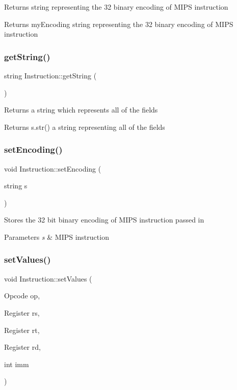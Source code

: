 Returns string representing the 32 binary encoding of M\+I\+PS instruction \begin{DoxyReturn}{Returns}
my\+Encoding string representing the 32 binary encoding of M\+I\+PS instruction 
\end{DoxyReturn}
\mbox{\label{class_instruction_a3deaa9fb80e0e3e5fbc6b32efaea2f98}} 
\subsubsection{\texorpdfstring{get\+String()}{getString()}}
{\footnotesize\ttfamily string Instruction\+::get\+String (\begin{DoxyParamCaption}{ }\end{DoxyParamCaption})}

Returns a string which represents all of the fields \begin{DoxyReturn}{Returns}
s.\+str() a string representing all of the fields 
\end{DoxyReturn}
\mbox{\label{class_instruction_ab10e98d595622a19f2ed0c94098692a2}} 
\subsubsection{\texorpdfstring{set\+Encoding()}{setEncoding()}}
{\footnotesize\ttfamily void Instruction\+::set\+Encoding (\begin{DoxyParamCaption}\item[{string}]{s }\end{DoxyParamCaption})\hspace{0.3cm}{\ttfamily [inline]}}

Stores the 32 bit binary encoding of M\+I\+PS instruction passed in 
\begin{DoxyParams}{Parameters}
{\em s} & M\+I\+PS instruction \\
\hline
\end{DoxyParams}
\mbox{\label{class_instruction_ab7bd4ac378e25f67296e30ab421602f8}} 
\subsubsection{\texorpdfstring{set\+Values()}{setValues()}}
{\footnotesize\ttfamily void Instruction\+::set\+Values (\begin{DoxyParamCaption}\item[{Opcode}]{op,  }\item[{Register}]{rs,  }\item[{Register}]{rt,  }\item[{Register}]{rd,  }\item[{int}]{imm }\end{DoxyParamCaption})}

